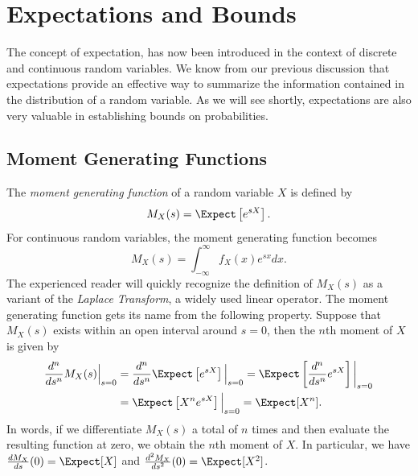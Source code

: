 \chapter{Expectations and Bounds}

The concept of expectation, has now been introduced in the context of discrete and continuous random variables.
We know from our previous discussion that expectations provide an effective way to summarize the information contained in the distribution of a random variable.
As we will see shortly, expectations are also very valuable in establishing bounds on probabilities.


\section{Moment Generating Functions}

The \emph{moment generating function} of a random variable $X$ is defined by
\begin{equation*}
M_X (s) = \Expect \left[ e^{s X} \right] .
\end{equation*}
For continuous random variables, the moment generating function becomes
\begin{equation*}
M_X (s) = \int_{-\infty}^{\infty} f_X (x) e^{s x} dx .
\end{equation*}
The experienced reader will quickly recognize the definition of $M_X(s)$ as a variant of the \emph{Laplace Transform}, a widely used linear operator.
The moment generating function gets its name from the following property.
Suppose that $M_X(s)$ exists within an open interval around $s = 0$, then the $n$th moment of $X$ is given by
\begin{equation*}
\begin{split}
\frac{d^n}{ds^n} M_X (s) \Big|_{s=0}
&= \frac{d^n}{ds^n} \Expect \left[ e^{s X} \right] \Big|_{s=0}
= \Expect \left[ \frac{d^n}{ds^n} e^{s X} \right] \bigg|_{s=0} \\
&= \Expect \left[ X^n e^{s X} \right] \Big|_{s=0}
= \Expect [X^n] .
\end{split}
\end{equation*}
In words, if we differentiate $M_X(s)$ a total of $n$ times and then evaluate the resulting function at zero, we obtain the $n$th moment of $X$.
In particular, we have $\frac{d M_X}{ds}(0) = \Expect [X]$ and $\frac{d^2 M_X}{ds^2}(0) = \Expect [X^2]$.

